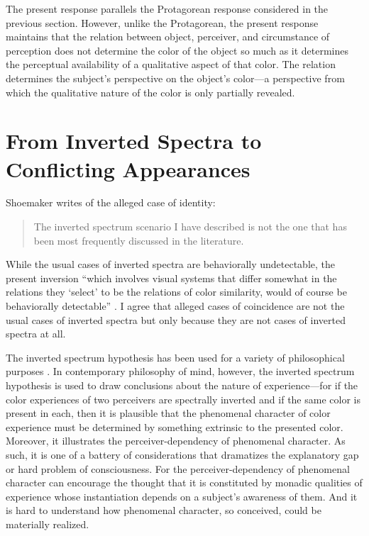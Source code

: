 \documentclass[12pt]{article}
\begin{document}
The present response parallels the Protagorean response considered in the previous section. However, unlike the Protagorean, the present response maintains that the relation between object, perceiver, and circumstance of perception does not determine the color of the object so much as it determines the perceptual availability of a qualitative aspect of that color. The relation determines the subject's perspective on the object's color---a perspective from which the qualitative nature of the color is only partially revealed.


\section{From Inverted Spectra to Conflicting Appearances}\label{sec:conclusion}


Shoemaker writes of the alleged case of identity: 
\begin{quote}
	The inverted spectrum scenario I have described is not the one that has been most frequently discussed in the literature. \citep[270]{Shoemaker:wk} 
\end{quote}
While the usual cases of inverted spectra are behaviorally undetectable, the present inversion ``which involves visual systems that differ somewhat in the relations they `select' to be the relations of color similarity, would of course be behaviorally detectable'' \citep[270]{Shoemaker:wk}. I agree that alleged cases of coincidence are not the usual cases of inverted spectra but only because they are not cases of inverted spectra at all.

The inverted spectrum hypothesis has been used for a variety of philosophical purposes \citep[see][for some of these]{Byrne:2005ve}. In contemporary philosophy of mind, however, the inverted spectrum hypothesis is used to draw conclusions about the nature of experience---for if the color experiences of two perceivers are spectrally inverted and if the same color is present in each, then it is plausible that the phenomenal character of color experience must be determined by something extrinsic to the presented color. Moreover, it illustrates the perceiver-dependency of phenomenal character. As such, it is one of a battery of considerations that dramatizes the explanatory gap or hard problem of consciousness. For the perceiver-dependency of phenomenal character can encourage the thought that it is constituted by monadic qualities of experience whose instantiation depends on a subject's awareness of them. And it is hard to understand how phenomenal character, so conceived, could be materially realized.
\end{document}
